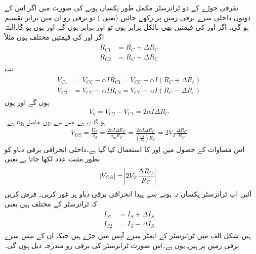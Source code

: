 تفرقی جوڑے کے دو ٹرانزسٹر مکمل طور یکساں ہونے کی صورت میں اگر اس کے دونوں داخلی سرے برقی زمین پر رکھے جائیں (یعنی  ) تو برقی رو  ان میں برابر تقسیم ہو گی۔ اگر  اور  کی قیمتیں بھی بالکل برابر ہوں تو  اور  برابر ہوں گے اور یوں  ہو گا۔البتہ اگر  اور  کی قیمتیں مختلف ہوں مثلاً
\begin{gather}
\begin{aligned}
R_{C1}&=R_C + \Delta R_C\\
R_{C2}&=R_C-\Delta R_C
\end{aligned}
\end{gather}
تب
\begin{gather}
\begin{aligned}
V_{C1}&=V_{CC}-\alpha I R_{C1}=V_{CC}-\alpha I \left (R_C + \Delta R_c \right )\\
V_{C2}&=V_{CC}-\alpha I R_{C2}=V_{CC}-\alpha I \left (R_C - \Delta R_c \right )
\end{aligned}
\end{gather}
ہوں گے اور یوں
\begin{align}
V_o=V_{C2}-V_{C1}=2 \alpha I \Delta R_C
\end{align}
ہو گا۔یہ  ہے جس سے  یوں حاصل ہوتا ہے۔
\begin{align}
V_{OS}=\frac{V_O}{ A_d}=\frac{2 \alpha I \Delta R_C}{g_m R_C} = \frac{2 \alpha I \Delta R_C}{\left( \frac{\alpha I}{V_T} \right ) R_C} =2 V_T \frac{\Delta R_C}{R_C}
\end{align}
اس مساوات کے حصول میں  اور  کا استعمال کیا گیا ہے۔داخلی انحرافی برقی دباو کو بطور مثبت عدد لکھا جاتا ہے یعنی
\begin{align}
\abs{V_{OS}}=\abs{2 V_T \frac{\Delta R_C}{R_C}}
\end{align}
آئیں اب ٹرانزسٹر یکساں نہ ہونے سے پیدا انحرافی برقی دباو پر غور کریں۔ فرض کریں کہ ٹرانزسٹر کے  مختلف ہیں یعنی
\begin{gather}
\begin{aligned}
I_{S1}&=I_S+\Delta I_S \\
I_{S2}&=I_S - \Delta I_S
\end{aligned}
\end{gather}
ہیں۔شکل  الف میں ٹرانزسٹر کے ایمٹر سرے آپس میں جڑے ہیں جبکہ ان کے بیس  سرے برقی زمین پر ہیں۔یوں  ہے۔اس صورت ٹرانزسٹر کی برقی رو مندرجہ ذیل ہوں گی۔

